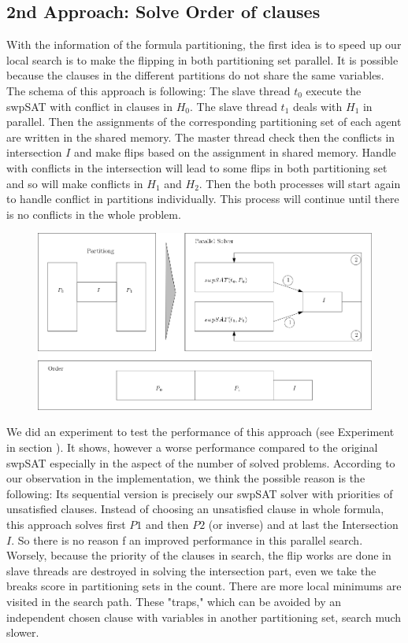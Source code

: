 \documentclass[12pt,a4paper,twoside]{scrartcl}
\numberwithin{equation}{section}
\begin{document}
\subsection{2nd Approach: Solve Order of clauses}
With the information of the formula partitioning, the first idea is to speed up our local search is to make the flipping in both partitioning set parallel. It is possible because the clauses in the different partitions do not share the same variables. The schema of this approach is following: The slave thread $t_0$ execute the swpSAT with  conflict in clauses in $H_0$. The slave thread $t_1$ deals with $H_1$ in parallel.  Then the assignments of the corresponding partitioning set of each agent are written in the shared memory. The master thread check then the conflicts in intersection $I$ and make flips based on the assignment in shared memory.  Handle with conflicts in the intersection will lead to some flips in both partitioning set and so will make conflicts in $H_1$ and $H_2$. Then the both processes will start again to handle conflict in partitions individually. This process will continue until there is no conflicts in the whole problem.
\begin{figure}[H]
\begin{center}
  \includegraphics[scale = 0.3]{1/a2.png}
  \end{center}
  \label{a2}
  \end{figure}
We did an experiment to test the performance of this approach (see Experiment in section ). It shows, however a worse performance compared to the original swpSAT especially in the aspect of the number of solved problems.  According to our observation in the implementation, we think the possible reason is the following: Its sequential version is precisely our swpSAT solver with priorities of unsatisfied clauses. Instead of choosing an unsatisfied clause in whole formula, this approach solves first $P1$ and then $P2$ (or inverse) and at last the Intersection $I$. So there is no reason f an improved performance in this parallel search. Worsely, because the priority of the clauses in search, the flip works are done in slave threads are destroyed in solving the intersection part, even we take the breaks score in partitioning sets in the count. There are more local minimums are visited in the search path. These "traps," which can be avoided by an independent chosen clause with variables in another partitioning set, search much slower.
\end{document}
